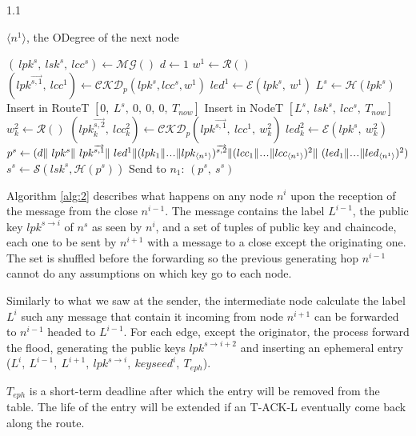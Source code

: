 \documentclass[12pt,oneside]{wlscirep}
\DeclareRobustCommand{\odegree}[1]{{\langle{#1}\rangle}}
\newcommand\xdots{\makebox[1em][c]{.\hfil.\hfil.}}
\DeclareRobustCommand{\kder}[1]{{\overrightarrow{{#1}}}}
\begin{document}
\begin{algorithm}
\caption{On sender node $n^s$, start T-FLOOD direct propagation.}
\label{alg:1}
\begin{spacing}{1.1}
\begin{algorithmic}[1]
\Require $\odegree{n^1}$, the ODegree of the next node
\Statex

\On{CLOSEADDED($n^1, \odegree{n^1}$)}
\If{$\odegree{n^1} > 0$} 
	\State $(~lpk^s,~lsk^s,~lcc^s) \gets \mathcal{MG}()$
	\State $d \gets 1$
    \State $w^1 \gets \mathcal{R}()$
	\State $(lpk^\kder{s,1},~lcc^1) \gets \mathcal{CKD}_p(lpk^s, lcc^s, w^1)$
    \State $led^1 \gets \mathcal{E}(lpk^s,~w^1)$
	\State $L^s \gets \mathcal{H}(lpk^s)$
	\State Insert in RouteT $[0,~L^s,~0,~0,~0,~T_{now}]$ 
	\State Insert in NodeT $[L^s,~lsk^s,~lcc^s,~T_{now}]$ 
    \For{$k\gets 1, \odegree{n^1}$} 
    	\State $w_k^2 \gets \mathcal{R}()$
        \State $(lpk_k^\kder{s,2},~lcc_k^2) \gets \mathcal{CKD}_p(lpk^\kder{s,1},~lcc^1,~w_k^2)$
        \State $led_k^2 \gets \mathcal{E}(lpk^s,~w_k^2)$
    \EndFor
	\State $p^s \gets (d \Vert ~lpk^s \Vert ~lpk^\kder{s,1} \Vert ~led^1 \Vert (lpk_1 \Vert \xdots \Vert lpk_\odegree{n^1})^\kder{s,2} \Vert (lcc_1 \Vert \xdots \Vert  lcc_\odegree{n^1})^2\Vert~(led_1 \Vert \xdots \Vert led_\odegree{n^1})^2)$ 
	\State $s^s \gets \mathcal{S}(lsk^s,\mathcal{H}(p^s))$
	\State Send to $n_1$: $(p^s,~s^s)$
\EndIf
\EndOn
\end{algorithmic}
\end{spacing}
\end{algorithm}

\newpage
Algorithm \ref{alg:2} describes what happens on any node $n^i$ upon the reception of the message from the close $n^{i-1}$. The message contains the label $L^{i-1}$, the public key $lpk^{s \to i}$ of $n^s$ as seen by $n^i$, and a set of tuples of public key and chaincode, each one to be sent by $n^{i+1}$ with a message to a close except the originating one. The set is shuffled before the forwarding so the previous generating hop $n^{i-1}$ cannot do any assumptions on which key go to each node.\par
Similarly to what we saw at the sender, the intermediate node calculate the label $L^i$ such any message that contain it incoming from node $n^{i+1}$ can be forwarded to $n^{i-1}$ headed to $L^{i-1}$. For each edge, except the originator, the process forward the flood, generating the public keys $lpk^{s \to i+2}$ and inserting an ephemeral entry ($L^i,~L^{i-1},~L^{i+1},~lpk^{s \to i},~keyseed^i,~T_{eph}$). \par
$T_{eph}$ is a short-term deadline after which the entry will be removed from the table. The life of the entry will be extended if an T-ACK-L eventually come back along the route.\par
\end{document}
